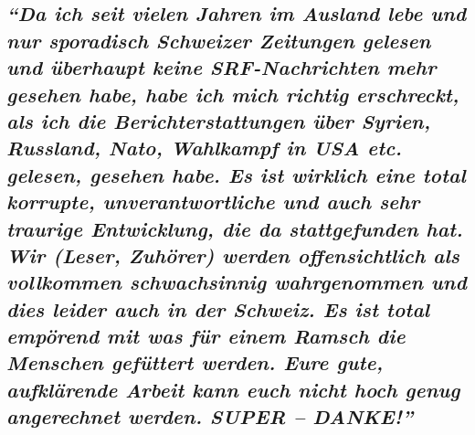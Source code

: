 \hypertarget{da-ich-seit-vielen-jahren-im-ausland-lebe-und-nur-sporadisch-schweizer-zeitungen-gelesen-und-uxfcberhaupt-keine-srf-nachrichten-mehr-gesehen-habe-habe-ich-mich-richtig-erschreckt-als-ich-die-berichterstattungen-uxfcber-syrien-russland-nato-wahlkampf-in-usa-etc-gelesen-gesehen-habe-es-ist-wirklich-eine-total-korrupte-unverantwortliche-und-auch-sehr-traurige-entwicklung-die-da-stattgefunden-hat-wir-leser-zuhuxf6rer-werden-offensichtlich-als-vollkommen-schwachsinnig-wahrgenommen-und-dies-leider-auch-in-der-schweiz-es-ist-total-empuxf6rend-mit-was-fuxfcr-einem-ramsch-die-menschen-gefuxfcttert-werden-eure-gute-aufkluxe4rende-arbeit-kann-euch-nicht-hoch-genug-angerechnet-werden-super--danke}{%
\subsection{\texorpdfstring{\emph{``Da ich seit vielen Jahren im Ausland
lebe und nur sporadisch Schweizer Zeitungen gelesen und überhaupt keine
SRF-Nachrichten mehr gesehen habe, habe ich mich richtig erschreckt, als
ich die Bericht­er­stattungen über Syrien, Russland, Nato, Wahlkampf in
USA etc. gelesen, gesehen habe. Es ist wirklich eine total korrupte,
un­ver­ant­wort­liche und auch sehr traurige Entwicklung, die da
statt­ge­funden hat. Wir (Leser, Zuhörer) werden offen­sicht­lich als
voll­kommen schwach­sinnig wahr­genommen und dies leider auch in der
Schweiz. Es ist total empörend mit was für einem Ramsch die Menschen
gefüttert werden. Eure gute, aufklärende Arbeit kann euch nicht hoch
genug angerechnet werden. SUPER --
DANKE!''}}{``Da ich seit vielen Jahren im Ausland lebe und nur sporadisch Schweizer Zeitungen gelesen und überhaupt keine SRF-Nachrichten mehr gesehen habe, habe ich mich richtig erschreckt, als ich die Bericht­er­stattungen über Syrien, Russland, Nato, Wahlkampf in USA etc. gelesen, gesehen habe. Es ist wirklich eine total korrupte, un­ver­ant­wort­liche und auch sehr traurige Entwicklung, die da statt­ge­funden hat. Wir (Leser, Zuhörer) werden offen­sicht­lich als voll­kommen schwach­sinnig wahr­genommen und dies leider auch in der Schweiz. Es ist total empörend mit was für einem Ramsch die Menschen gefüttert werden. Eure gute, aufklärende Arbeit kann euch nicht hoch genug angerechnet werden. SUPER -- DANKE!''}}\label{da-ich-seit-vielen-jahren-im-ausland-lebe-und-nur-sporadisch-schweizer-zeitungen-gelesen-und-uxfcberhaupt-keine-srf-nachrichten-mehr-gesehen-habe-habe-ich-mich-richtig-erschreckt-als-ich-die-berichterstattungen-uxfcber-syrien-russland-nato-wahlkampf-in-usa-etc-gelesen-gesehen-habe-es-ist-wirklich-eine-total-korrupte-unverantwortliche-und-auch-sehr-traurige-entwicklung-die-da-stattgefunden-hat-wir-leser-zuhuxf6rer-werden-offensichtlich-als-vollkommen-schwachsinnig-wahrgenommen-und-dies-leider-auch-in-der-schweiz-es-ist-total-empuxf6rend-mit-was-fuxfcr-einem-ramsch-die-menschen-gefuxfcttert-werden-eure-gute-aufkluxe4rende-arbeit-kann-euch-nicht-hoch-genug-angerechnet-werden-super--danke}}

